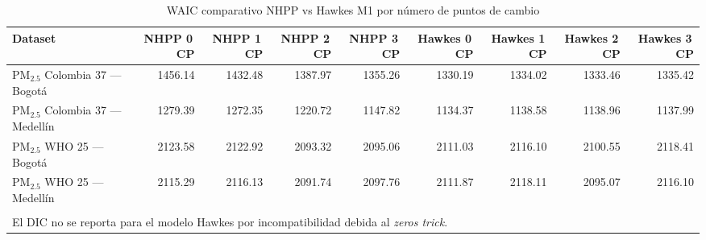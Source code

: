 \begin{table}[htbp]
\centering
\caption{WAIC comparativo NHPP vs Hawkes M1 por n\'{u}mero de puntos de cambio}
\label{tab:comp_waic}
\begin{tabular}{lrrrrrrrr}
\toprule
Dataset & NHPP 0\,CP & NHPP 1\,CP & NHPP 2\,CP & NHPP 3\,CP & Hawkes 0\,CP & Hawkes 1\,CP & Hawkes 2\,CP & Hawkes 3\,CP \\
\midrule
PM$_{2.5}$ Colombia 37 --- Bogot\'{a} & 1456.14 & 1432.48 & 1387.97 & 1355.26 & 1330.19 & 1334.02 & 1333.46 & 1335.42 \\
PM$_{2.5}$ Colombia 37 --- Medell\'{i}n & 1279.39 & 1272.35 & 1220.72 & 1147.82 & 1134.37 & 1138.58 & 1138.96 & 1137.99 \\
PM$_{2.5}$ WHO 25 --- Bogot\'{a} & 2123.58 & 2122.92 & 2093.32 & 2095.06 & 2111.03 & 2116.10 & 2100.55 & 2118.41 \\
PM$_{2.5}$ WHO 25 --- Medell\'{i}n & 2115.29 & 2116.13 & 2091.74 & 2097.76 & 2111.87 & 2118.11 & 2095.07 & 2116.10 \\
\bottomrule
\\[-0.5em]
\multicolumn{9}{l}{\footnotesize El DIC no se reporta para el modelo Hawkes por incompatibilidad debida al \textit{zeros trick}.}
\end{tabular}
\end{table}
